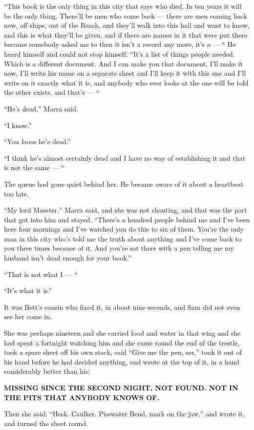 “This book is the only thing in this city that says who died. In ten years it will be the only thing. There’ll be men who come back — there are men coming back now, off ships, out of the Reach, and they’ll walk into this hall and want to know, and this is what they’ll be given, and if there are names in it that were put there because somebody asked me to then it isn’t a record any more, it’s a — “ He heard himself and could not stop himself. “It’s a list of things people needed. Which is a different document. And I can make you that document, I’ll make it now, I’ll write his name on a separate sheet and I’ll keep it with this one and I’ll write on it exactly what it is, and anybody who ever looks at the one will be told the other exists, and that’s — “

“He’s dead,” Marra said.

“I know.”

“You \textit{know} he’s dead.”

“I think he’s almost certainly dead and I have no way of establishing it and that is not the same — “

The queue had gone quiet behind her. He became aware of it about a heartbeat too late.

“My lord Maester,” Marra said, and she was not shouting, and that was the part that got into him and stayed. “There’s a hundred people behind me and I’ve been here four mornings and I’ve watched you do this to six of them. You’re the only man in this city who’s told me the truth about anything and I’ve come back to you three times because of it. And you’re sat there with a pen telling me my husband isn’t dead enough for your book.”

“That is not what I — “

“It’s what it is.”

\sceneBreak

It was Bett’s cousin who fixed it, in about nine seconds, and Sam did not even see her come in.

She was perhaps nineteen and she carried food and water in that wing and she had spent a fortnight watching him and she came round the end of the trestle, took a spare sheet off his own stack, said “Give me the pen, ser,” took it out of his hand before he had decided anything, and wrote at the top of it, in a hand considerably better than his:

\textbf{MISSING SINCE THE SECOND NIGHT. NOT FOUND. NOT IN THE PITS THAT ANYBODY KNOWS OF.}

Then she said: “Hesk. Caulker. Pisswater Bend, mark on the jaw,” and wrote it, and turned the sheet round.

